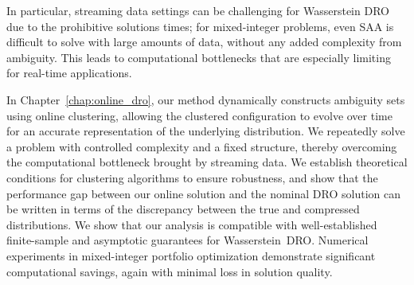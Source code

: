 In particular, streaming data settings can be challenging for Wasserstein \gls{DRO} due to the prohibitive solutions times; for mixed-integer problems, even \gls{SAA} is difficult to solve with large amounts of data, without any added complexity from ambiguity. This leads to computational bottlenecks that are especially limiting for real-time applications.


In Chapter~\ref{chap:online_dro}, our method dynamically constructs ambiguity sets using online clustering, allowing the clustered configuration to evolve over time for an accurate representation of the underlying distribution. We repeatedly solve a problem with controlled complexity and a fixed structure, thereby overcoming the computational bottleneck brought by streaming data.
We establish theoretical conditions for clustering algorithms to ensure robustness, and show that the performance gap between our online solution and the nominal \gls{DRO} solution can be written in terms of the discrepancy between the true and compressed distributions.
We show that our analysis is compatible with well-established finite-sample and asymptotic guarantees for Wasserstein~\gls{DRO}.
Numerical experiments in mixed-integer portfolio optimization demonstrate significant computational savings, again with minimal loss in solution quality.






